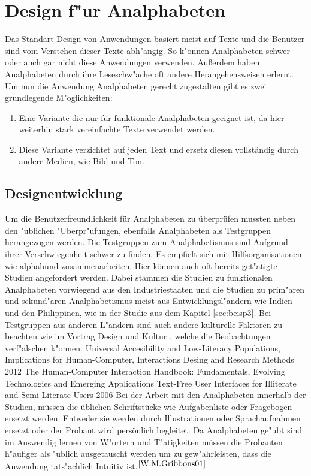 \section{Design f"ur Analphabeten}
Das Standart Design von Anwendungen basiert meist auf Texte und die Benutzer sind vom Verstehen dieser Texte abh"angig. So  k"onnen Analphabeten schwer oder auch gar nicht diese Anwendungen verwenden. Außerdem haben Analphabeten durch ihre Leseschw"ache oft andere Herangehensweisen erlernt.\\
Um nun die Anwendung Analphabeten gerecht zugestalten gibt es zwei grundlegende M"oglichkeiten:
\begin{enumerate}
	\item Eine Variante die nur für funktionale Analphabeten geeignet ist, da hier weiterhin stark vereinfachte Texte verwendet werden.
	\item Diese Variante verzichtet auf jeden Text und ersetz diesen vollständig durch andere Medien, wie Bild und Ton.
\end{enumerate}

\subsection{Designentwicklung}\label{sec:designEval}
Um die Benutzerfreundlichkeit für Analphabeten zu überprüfen mussten neben den "ublichen "Uberpr"ufungen, ebenfalls Analphabeten als Testgruppen herangezogen werden. Die Testgruppen zum Analphabetismus sind Aufgrund ihrer Verschwiegenheit schwer zu finden. Es empfielt sich mit  Hilfsorganisationen wie \glqq alphabund \grqq zusammenarbeiten. Hier können auch oft bereits get"atigte Studien angefordert werden. Dabei stammen die Studien zu funktionalen Analphabeten vorwiegend aus den Industriestaaten und die Studien zu prim"aren und sekund"aren Analphabetismus meist aus Entwicklungsl"andern wie Indien und den Philippinen,  wie in der Studie aus dem Kapitel \ref{sec:beisp3}. Bei Testgruppen aus anderen L"andern sind auch andere kulturelle Faktoren zu beachten wie im Vortrag \glqq Design und Kultur \grqq, welche die Beobachtungen verf"alschen k"onnen.  
					{Universal Accesibility and Low-Literacy Populations, Implications for Human-Computer, Interactions Desing and Research Methods}
					{2012}
					{The Human-Computer Interaction Handbook: Fundamentals, Evolving Technologies and Emerging Applications}
					{Text-Free User Interfaces for Illiterate and Semi Literate Users}
					{2006}{}
Bei der Arbeit mit den Analphabeten innerhalb der Studien, müssen die üblichen Schriftstücke wie Aufgabenliste oder Fragebogen ersetzt werden. Entweder sie werden durch Illustrationen oder Sprachaufnahmen ersetzt oder der Probant wird persönlich begleitet.
Da Analphabeten ge"ubt sind im Auswendig lernen von W"ortern und T"atigkeiten müssen die Probanten h"aufiger als "ublich ausgetauscht werden um zu gew"ahrleisten, dass die Anwendung tats"achlich Intuitiv ist.$^{\ref{W.M.Gribbons01}}$\\

